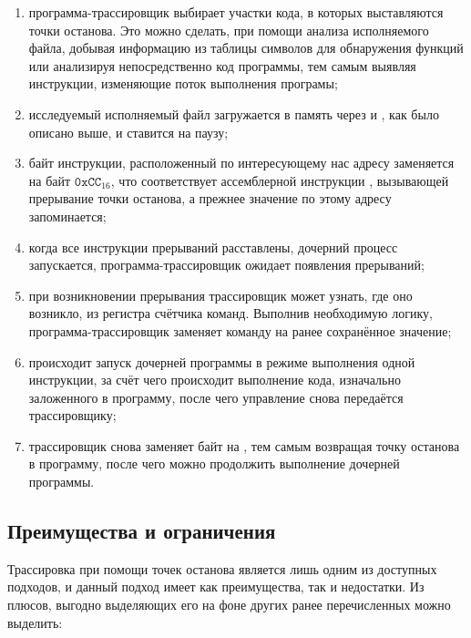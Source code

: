 \begin{enumerate}
	\item программа-трассировщик выбирает участки кода, в которых выставляются точки останова. Это можно сделать, при помощи анализа исполняемого файла, добывая информацию из таблицы символов для обнаружения функций или анализируя непосредственно код программы, тем самым выявляя инструкции, изменяющие поток выполнения програмы;
	
	\item исследуемый исполняемый файл загружается в память через  и , как было описано выше, и ставится на паузу;
	
	\item байт инструкции, расположенный по интересующему нас адресу заменяется на байт $\mathtt{0xCC}_{16}$, что соответствует ассемблерной инструкции , вызывающей прерывание точки останова, а прежнее значение по этому адресу запоминается;
	
	\item когда все инструкции прерываний расставлены, дочерний процесс запускается, программа-трассировщик ожидает появления прерываний;
	
	\item при возникновении прерывания трассировщик может узнать, где оно возникло, из регистра счётчика команд. Выполнив необходимую логику, программа-трассировщик заменяет команду на ранее сохранённое значение;
	
	\item происходит запуск дочерней программы в режиме выполнения одной инструкции, за счёт чего происходит выполнение кода, изначально заложенного в программу, после чего управление снова передаётся трассировщику;
	
	\item трассировщик снова заменяет байт на , тем самым возвращая точку останова в программу, после чего можно продолжить выполнение дочерней программы.
\end{enumerate}

\subsection{Преимущества и ограничения}

Трассировка при помощи точек останова является лишь одним из доступных подходов, и данный подход имеет как преимущества, так и недостатки. Из плюсов, выгодно выделяющих его на фоне других ранее перечисленных можно выделить:

